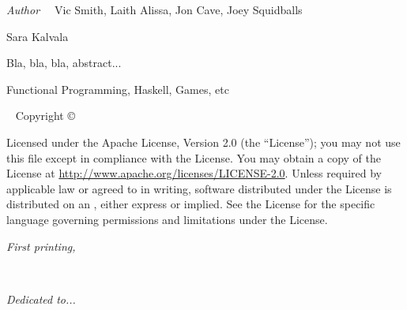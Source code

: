 \newpage
\begin{fullwidth}
	{\large {\it Author\ \ } Vic Smith, Laith Alissa, Jon Cave, Joey Squidballs
	
	\vspace{1em} Sara Kalvala
	
	\vspace{1em} Bla, bla, bla, abstract...
	
	\vspace{1em} Functional Programming, Haskell, Games, etc
	
	}
	
	~\vfill
	\thispagestyle{empty}
	\setlength{\parindent}{0pt}
	\setlength{\parskip}{\baselineskip}
	Copyright \copyright\ \the\year\ \thanklessauthor
	
	\par{}
	
	
	\par Licensed under the Apache License, Version 2.0 (the ``License''); you may not
	use this file except in compliance with the License. You may obtain a copy
	of the License at \url{http://www.apache.org/licenses/LICENSE-2.0}. Unless
	required by applicable law or agreed to in writing, software distributed
	under the License is distributed on an , either express or implied. See the
	License for the specific language governing permissions and limitations
	under the License.
	
	\par\textit{First printing, \monthyear}


\tableofcontents

\end{fullwidth}



\cleardoublepage
~\vfill
\begin{doublespace}
\noindent\fontsize{18}{22}\selectfont\itshape
\nohyphenation
Dedicated to...
\end{doublespace}
\vfill
\vfill


\mainmatter

